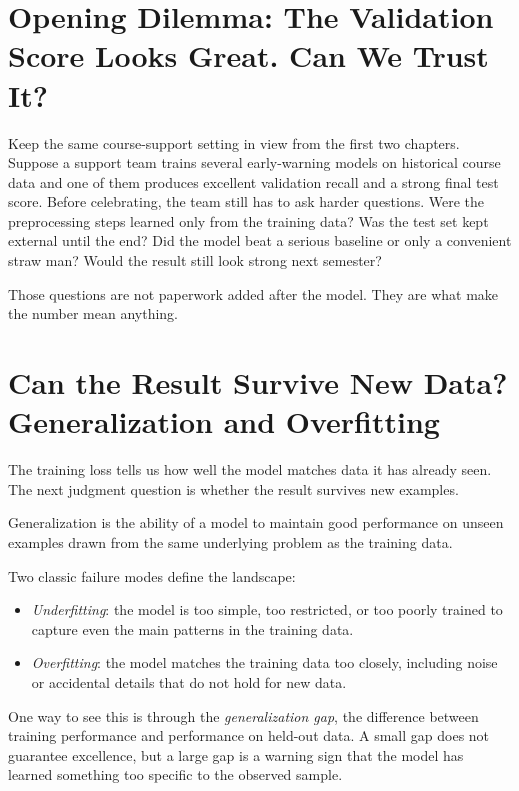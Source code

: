 \section{Opening Dilemma: The Validation Score Looks Great. Can We Trust It?}

Keep the same course-support setting in view from the first two chapters. Suppose a support team trains several early-warning models on historical course data and one of them produces excellent validation recall and a strong final test score. Before celebrating, the team still has to ask harder questions. Were the preprocessing steps learned only from the training data? Was the test set kept external until the end? Did the model beat a serious baseline or only a convenient straw man? Would the result still look strong next semester?

Those questions are not paperwork added after the model. They are what make the number mean anything.

\section{Can the Result Survive New Data? Generalization and Overfitting}

The training loss tells us how well the model matches data it has already seen. The next judgment question is whether the result survives new examples.

\begin{definition}[Generalization]
Generalization is the ability of a model to maintain good performance on unseen examples drawn from the same underlying problem as the training data.
\end{definition}

Two classic failure modes define the landscape:
\begin{itemize}[leftmargin=*]
\item \emph{Underfitting}: the model is too simple, too restricted, or too poorly trained to capture even the main patterns in the training data.
\item \emph{Overfitting}: the model matches the training data too closely, including noise or accidental details that do not hold for new data.
\end{itemize}

One way to see this is through the \emph{generalization gap}, the difference between training performance and performance on held-out data. A small gap does not guarantee excellence, but a large gap is a warning sign that the model has learned something too specific to the observed sample.

